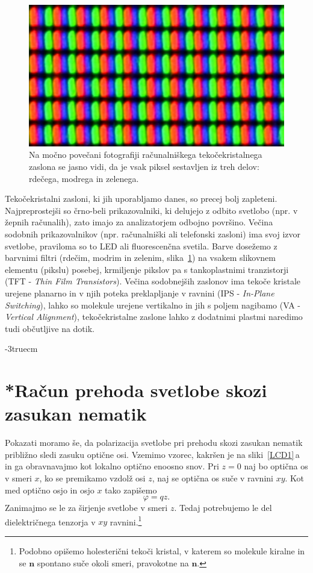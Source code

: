 \begin{figure}[h!]
\centering
\includegraphics[width=80truemm]{slike/09_LCD.jpg}
\caption{Na močno povečani fotografiji računalniškega tekočekristalnega zaslona se 
jasno vidi, da je vsak piksel sestavljen iz treh delov: rdečega, modrega in zelenega.}
\label{fig:LCD}
\end{figure}
\begin{remark}
Tekočekristalni zasloni, ki jih uporabljamo danes, so precej bolj zapleteni.
Najpreprostejši so črno-beli prikazovalniki, ki delujejo z odbito svetlobo (npr. 
v žepnih računalih), zato imajo za analizatorjem odbojno površino. Večina 
sodobnih prikazovalnikov (npr. računalniški ali telefonski zasloni) ima svoj izvor svetlobe, 
praviloma so to LED ali fluorescenčna svetila.
Barve dosežemo z barvnimi filtri (rdečim, modrim in zelenim, slika~\ref{fig:LCD}) na vsakem 
slikovnem elementu (pikslu) posebej, krmiljenje pikslov pa s tankoplastnimi 
tranzistorji (TFT - {\it Thin Film Transistors}). Večina
sodobnejših zaslonov ima tekoče kristale urejene planarno in v njih poteka
preklapljanje v ravnini (IPS - {\it In-Plane Switching}), lahko so molekule
urejene vertikalno in jih s poljem nagibamo (VA - {\it Vertical Alignment}), tekočekristalne 
zaslone lahko z dodatnimi plastmi naredimo tudi občutljive na dotik.
\end{remark}
\vglue-3truecm
\section{*Račun prehoda svetlobe skozi zasukan nematik}
Pokazati moramo še, da polarizacija svetlobe pri prehodu skozi zasukan nematik 
približno sledi zasuku optične osi. 
Vzemimo vzorec, kakršen je na sliki~\ref{LCD1}\,a in ga obravnavajmo
kot lokalno optično enoosno snov. Pri $z=0$ naj bo optična
os v smeri $x$, ko se premikamo vzdolž osi $z$, naj se optična os suče
v ravnini $xy$. Kot med optično osjo in osjo $x$ tako zapišemo 
\begin{equation}
\varphi=qz.
\label{7.58}
\end{equation}
Zanimajmo se le za širjenje svetlobe v smeri $z$. 
Tedaj potrebujemo le del dielektričnega
tenzorja v $xy$ ravnini.\footnote{Podobno opišemo holesterični tekoči kristal, v
katerem so molekule kiralne in se $\mathbf{n}$ spontano suče okoli
smeri, pravokotne na $\mathbf{n}$.} 

